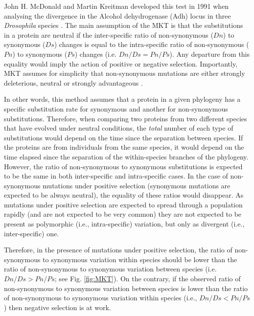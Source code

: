 John H. McDonald and Martin Kreitman developed this test in 1991 when analysing the divergence in the Alcohol dehydrogenase (Adh) locus in three \textit{Drosophila} species	\citep{McDonald1991}. 
%
The main assumption of the MKT is that the substitutions in a protein are neutral if the inter-specific ratio of non-synonymous ($Dn$) to synonymous ($Ds$) changes is equal to the intra-specific ratio of non-synonymous ($Pn$) to synonymous ($Ps$) changes (i.e. $Dn/Ds = Pn/Ps$).
Any departure from this equality would imply the action of positive or negative selection.
%
Importantly, MKT assumes for simplicity that non-synonymous mutations are either strongly deleterious, neutral or strongly advantageous \citep{McDonald1991}.
%

In other words, this method assumes that a protein in a given phylogeny has a specific substitution rate for synonymous and another for non-synonymous substitutions. Therefore, when comparing two proteins from two different species that have evolved under neutral conditions, the \textit{total} number of each type of substitutions would depend on the time since the separation between species. If the proteins are from individuals from the same species, it would depend on the time elapsed since the separation of the within-species branches of the phylogeny.
However, the ratio of non-synonymous to synonymous substitutions is expected to be the same in both inter-specific and intra-specific cases. 
In the case of non-synonymous mutations under positive selection (synonymous mutations are expected to be always neutral), the equality of these ratios would disappear. As mutations under positive selection are expected to spread through a population rapidly (and are not expected to be very common) they are not expected to be present as polymorphic (i.e., intra-specific) variation, but only as divergent (i.e., inter-specific) one.

Therefore, in the presence of mutations under positive selection, the ratio of non-synonymous to synonymous variation within species should be lower than the ratio of non-synonymous to synonymous variation between species (i.e. $Dn/Ds > Pn/Ps$; see Fig. \ref{fig:MKT}). 
On the contrary, if the observed ratio of non-synonymous to synonymous variation between species is lower than the ratio of non-synonymous to synonymous variation within species (i.e., $Dn/Ds < Pn/Ps$) then negative selection is at work.
%

